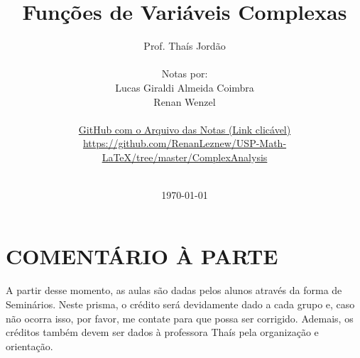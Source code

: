 \documentclass{article}
\title{Funções de Variáveis Complexas}
\author{Prof. Thaís Jordão\\
  \vspace{2cm}\\
  Notas por:\\
  Lucas Giraldi Almeida Coimbra\\
  Renan Wenzel\\
  \vspace{4cm}\\
  \href{https://github.com/RenanLeznew/USP-Math-LaTeX/tree/master/ComplexAnalysis}{GitHub com o Arquivo das Notas (Link clicável)}\\
  \url{https://github.com/RenanLeznew/USP-Math-LaTeX/tree/master/ComplexAnalysis}\\
  \vspace{4cm}\\
}
\date{\today}
\begin{document}
\maketitle
\newpage
\tableofcontents
\newpage


\newpage

\newpage

\newpage

\newpage

\newpage

\newpage

\newpage

\newpage

\newpage

\newpage

\newpage

\newpage

\newpage

\newpage
\section*{COMENTÁRIO À PARTE}
\paragraph{}  A partir desse momento, as aulas são dadas pelos alunos através da forma de Seminários. Neste prisma, o crédito será
devidamente dado a cada grupo e, caso não ocorra isso, por favor, me contate para que possa ser corrigido. Ademais, os créditos
também devem ser dados à professora Thaís pela organização e orientação.
\newpage

\newpage

\newpage

\newpage

\newpage

\newpage
\end{document}
